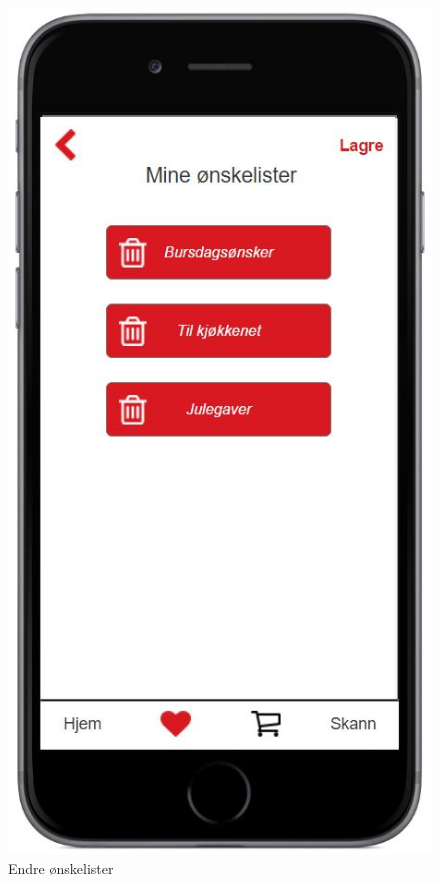 \begin{figure}[H]
\includegraphics[scale=0.55]{images/axurebilder/endre_mine_onskelister_2}
\centering %
\caption{Endre ønskelister}
\label{fig:endre_mine_onskelister_2}
\end{figure}

